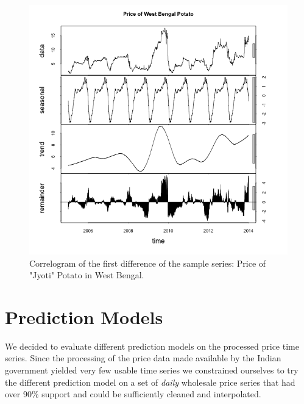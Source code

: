 \begin{figure}
    \centering
    \includegraphics[width=.7\textwidth]{./img/seasonal.png}
    \caption{Correlogram of the first difference of the sample series: Price of "Jyoti" Potato in West Bengal.}
\end{figure}


\section*{Prediction Models}
We decided to evaluate different prediction models on the processed price time series. Since the processing of the price data made available by the Indian government yielded very few usable time series we constrained ourselves to try the different prediction model on a set of \emph{daily} wholesale price series that had over 90\% support and could be sufficiently cleaned and interpolated.

